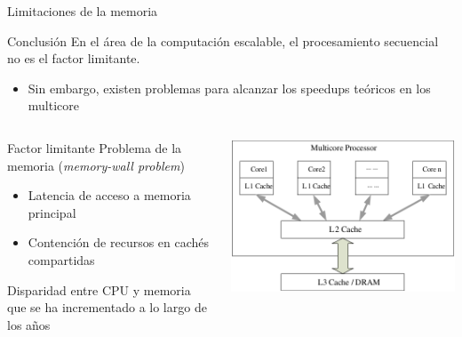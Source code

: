 \documentclass[utf8]{beamer}
\begin{document}
\begin{frame}{Limitaciones de la memoria}
    \begin{block}{Conclusión}
        En el área de la computación escalable, el procesamiento secuencial no es el factor limitante.
        \begin{itemize}
        \item Sin embargo, existen problemas para alcanzar los speedups teóricos en los multicore
        \end{itemize}
    \end{block}
    \begin{columns}
        \begin{column}{.6\linewidth}
            \begin{block}{Factor limitante}
                \small
                Problema de la memoria (\emph{memory-wall problem})
                \begin{itemize}
                    \item Latencia de acceso a memoria principal
                    \item Contención de recursos en cachés compartidas
                \end{itemize}
                Disparidad entre CPU y memoria que se ha incrementado a lo largo de los años
            \end{block}
        \end{column}
        \begin{column}{.3\linewidth}
            \begin{center}
            \includegraphics[width=1.1\linewidth]{figures/multicore_mem}
            \end{center}
        \end{column}
    \end{columns} 
\end{frame}
\end{document}
